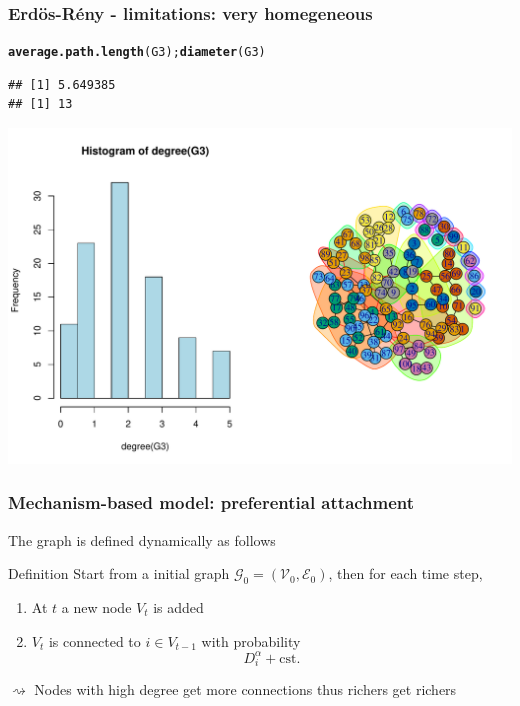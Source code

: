 \documentclass{beamer}\usepackage[]{graphicx}\usepackage[]{color}
\makeatletter
\newcommand{\hlstd}[1]{\textcolor[rgb]{0.345,0.345,0.345}{#1}}%
\newcommand{\hlkwd}[1]{\textcolor[rgb]{0.737,0.353,0.396}{\textbf{#1}}}%
\newenvironment{kframe}{%
 \def\at@end@of@kframe{}%
 \ifinner\ifhmode%
  \def\at@end@of@kframe{\end{minipage}}%
  \begin{minipage}{\columnwidth}%
 \fi\fi%
 \def\FrameCommand##1{\hskip\@totalleftmargin \hskip-\fboxsep
 \colorbox{shadecolor}{##1}\hskip-\fboxsep
     \hskip-\linewidth \hskip-\@totalleftmargin \hskip\columnwidth}%
 \MakeFramed {\advance\hsize-\width
   \@totalleftmargin\z@ \linewidth\hsize
   \@setminipage}}%
 {\par\unskip\endMakeFramed%
 \at@end@of@kframe}
\newenvironment{knitrout}{}{} %
\makeatother
\begin{document}
\begin{frame}[fragile]
  \frametitle{Erdös-Rény - limitations: very homegeneous}

\begin{knitrout}\scriptsize
{}\color{fgcolor}\begin{kframe}
\begin{alltt}
\hlkwd{average.path.length}\hlstd{(G3);} \hlkwd{diameter}\hlstd{(G3)}
\end{alltt}
\begin{verbatim}
## [1] 5.649385
## [1] 13
\end{verbatim}
\end{kframe}
\end{knitrout}

\begin{knitrout}\scriptsize
{}\color{fgcolor}
\includegraphics[width=.8\textwidth]{figures/ER_limitation2-1} 
\end{knitrout}
\end{frame}

\begin{frame}
  \frametitle{Mechanism-based model: preferential attachment}

  The graph is defined dynamically as follows
  \begin{block}{Definition}
    Start from a initial graph $\mathcal{G}_0 = (\mathcal{V}_0,\mathcal{E}_0)$, then for each time step,
    \begin{enumerate}
      \item At $t$ a new node $V_t$ is added
      \item $V_t$ is connected to $i \in V_{t-1}$ with probability
      \begin{equation*}
        D_i^\alpha + \mathrm{cst.}
      \end{equation*}
    \end{enumerate}
  \end{block}
  $\rightsquigarrow$ Nodes with high degree get more connections thus \alert{richers get richers}
\end{frame}
\end{document}
